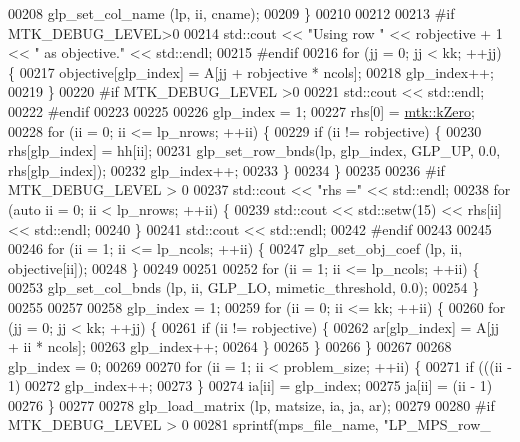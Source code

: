 \begin{DoxyCode}
{{00208     glp\_set\_col\_name (lp, ii, cname);
00209   \}
00210 
00212 
00213 \textcolor{preprocessor}{  #if MTK\_DEBUG\_LEVEL>0}
00214   std::cout << \textcolor{stringliteral}{"Using row "} << robjective + 1 << \textcolor{stringliteral}{" as objective."} << std::endl;
00215 \textcolor{preprocessor}{  #endif}
00216   \textcolor{keywordflow}{for} (jj = 0; jj < kk; ++jj) \{
00217     objective[glp\_index] = A[jj + robjective * ncols];
00218     glp\_index++;
00219   \}
00220 \textcolor{preprocessor}{  #if MTK\_DEBUG\_LEVEL >0}
00221   std::cout << std::endl;
00222 \textcolor{preprocessor}{  #endif}
00223 
00225 
00226   glp\_index = 1;
00227   rhs[0] = \hyperlink{group__c01-roots_ga59a451a5fae30d59649bcda274fea271}{mtk::kZero};
00228   \textcolor{keywordflow}{for} (ii = 0; ii <= lp\_nrows; ++ii) \{
00229     \textcolor{keywordflow}{if} (ii != robjective) \{
00230       rhs[glp\_index] = hh[ii];
00231       glp\_set\_row\_bnds(lp, glp\_index, GLP\_UP, 0.0, rhs[glp\_index]);
00232       glp\_index++;
00233     \}
00234   \}
00235 
00236 \textcolor{preprocessor}{  #if MTK\_DEBUG\_LEVEL > 0}
00237   std::cout << \textcolor{stringliteral}{"rhs ="} << std::endl;
00238   \textcolor{keywordflow}{for} (\textcolor{keyword}{auto} ii = 0; ii < lp\_nrows; ++ii) \{
00239     std::cout << std::setw(15) << rhs[ii] << std::endl;
00240   \}
00241   std::cout << std::endl;
00242 \textcolor{preprocessor}{  #endif}
00243 
00245 
00246   \textcolor{keywordflow}{for} (ii = 1; ii <= lp\_ncols; ++ii) \{
00247     glp\_set\_obj\_coef (lp, ii, objective[ii]);
00248   \}
00249 
00251 
00252   \textcolor{keywordflow}{for} (ii = 1; ii <= lp\_ncols; ++ii) \{
00253     glp\_set\_col\_bnds (lp, ii, GLP\_LO, mimetic\_threshold, 0.0);
00254   \}
00255 
00257 
00258   glp\_index = 1;
00259   \textcolor{keywordflow}{for} (ii = 0; ii <= kk; ++ii) \{
00260     \textcolor{keywordflow}{for} (jj = 0; jj < kk; ++jj) \{
00261       \textcolor{keywordflow}{if} (ii != robjective) \{
00262         ar[glp\_index] = A[jj + ii * ncols];
00263         glp\_index++;
00264       \}
00265     \}
00266   \}
00267 
00268   glp\_index = 0;
00269 
00270   \textcolor{keywordflow}{for} (ii = 1; ii < problem\_size; ++ii) \{
00271     \textcolor{keywordflow}{if} (((ii - 1) %
00272       glp\_index++;
00273     \}
00274     ia[ii] = glp\_index;
00275     ja[ii] = (ii - 1) %
00276   \}
00277 
00278   glp\_load\_matrix (lp, matsize, ia, ja, ar);
00279 
00280 \textcolor{preprocessor}{  #if MTK\_DEBUG\_LEVEL > 0}
00281   sprintf(mps\_file\_name, \textcolor{stringliteral}{"LP\_MPS\_row\_%
}}}
\end{DoxyCode}
